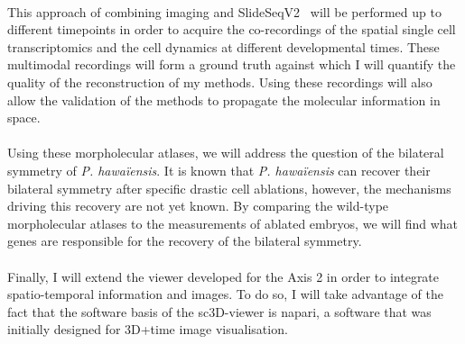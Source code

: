 \paragraph{}This approach of combining imaging and SlideSeqV2~\cite{Stickels2021} will be performed up to different timepoints in order to acquire the co-recordings of the spatial single cell transcriptomics and the cell dynamics at different developmental times.
These multimodal recordings will form a ground truth against which I will quantify the quality of the reconstruction of my methods.
Using these recordings will also allow the validation of the methods to propagate the molecular information in space.
\paragraph{}Using these morpholecular atlases, we will address the question of the bilateral symmetry of \textit{P. hawaïensis}.
It is known that \textit{P. hawaïensis} can recover their bilateral symmetry after specific drastic cell ablations, however, the mechanisms driving this recovery are not yet known.
By comparing the wild-type morpholecular atlases to the measurements of ablated embryos, we will find what genes are responsible for the recovery of the bilateral symmetry.
\paragraph{}Finally, I will extend the viewer developed for the Axis 2 in order to integrate spatio-temporal information and images.
To do so, I will take advantage of the fact that the software basis of the sc3D-viewer is napari, a software that was initially designed for 3D+time image visualisation.

